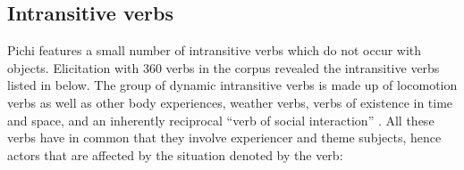 \subsection{Intransitive verbs}\label{sec:9.2.1}

Pichi features a small number of intransitive verbs which do not occur with objects. Elicitation with 360 verbs in the corpus revealed the intransitive verbs listed in  below. The group of dynamic intransitive verbs is made up of locomotion verbs as well as other body experiences, weather verbs, verbs of existence in time and space, and an inherently reciprocal “verb of social interaction” \citep[201]{Levin1993}. All these verbs have in common that they involve experiencer and theme subjects, hence actors that are affected by the situation denoted by the verb: 

